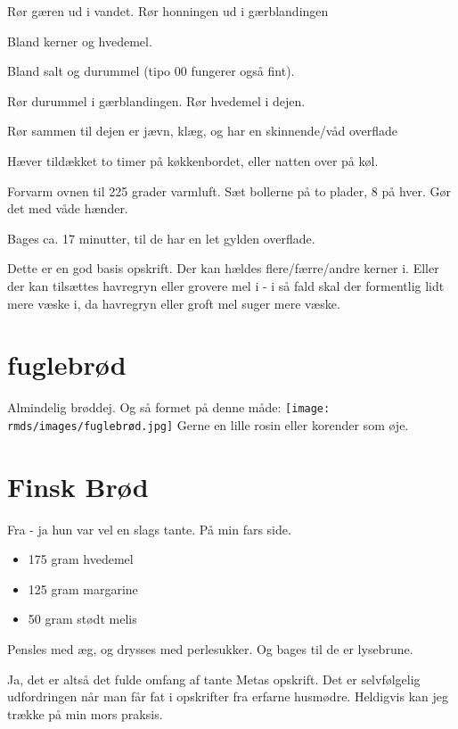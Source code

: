 \documentclass[
  letterpaper,
  DIV=11,
  numbers=noendperiod]{scrreprt}
\providecommand{\tightlist}{%
  \setlength{\itemsep}{0pt}\setlength{\parskip}{0pt}}\usepackage{longtable,booktabs,array}
\begin{document}
Rør gæren ud i vandet. Rør honningen ud i gærblandingen

Bland kerner og hvedemel.

Bland salt og durummel (tipo 00 fungerer også fint).

Rør durummel i gærblandingen. Rør hvedemel i dejen.

Rør sammen til dejen er jævn, klæg, og har en skinnende/våd overflade

Hæver tildækket to timer på køkkenbordet, eller natten over på køl.

Forvarm ovnen til 225 grader varmluft. Sæt bollerne på to plader, 8 på
hver. Gør det med våde hænder.

Bages ca. 17 minutter, til de har en let gylden overflade.

Dette er en god basis opskrift. Der kan hældes flere/færre/andre kerner
i. Eller der kan tilsættes havregryn eller grovere mel i - i så fald
skal der formentlig lidt mere væske i, da havregryn eller groft mel
suger mere væske.

\hypertarget{fuglebruxf8d-1}{%
\section{fuglebrød}\label{fuglebruxf8d-1}}

Almindelig brøddej. Og så formet på denne måde:
\texttt{[image: rmds/images/fuglebrød.jpg]} Gerne en lille rosin eller
korender som øje.

\hypertarget{finsk-bruxf8d-1}{%
\section{Finsk Brød}\label{finsk-bruxf8d-1}}

Fra - ja hun var vel en slags tante. På min fars side.

\begin{itemize}
\tightlist
\item
  175 gram hvedemel
\item
  125 gram margarine
\item
  50 gram stødt melis
\end{itemize}

Pensles med æg, og drysses med perlesukker. Og bages til de er
lysebrune.

Ja, det er altså det fulde omfang af tante Metas opskrift. Det er
selvfølgelig udfordringen når man får fat i opskrifter fra erfarne
husmødre. Heldigvis kan jeg trække på min mors praksis.
\end{document}
